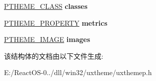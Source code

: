 \begin{DoxyCompactItemize}
\hyperlink{struct___t_h_e_m_e___c_l_a_s_s}{P\+T\+H\+E\+M\+E\+\_\+\+C\+L\+A\+SS} {\bfseries classes}
\item 
\mbox{\label{struct___t_h_e_m_e___f_i_l_e_a12c21a52f83266e7b3b21f800dd5a137}} 
\hyperlink{struct___t_h_e_m_e___p_r_o_p_e_r_t_y}{P\+T\+H\+E\+M\+E\+\_\+\+P\+R\+O\+P\+E\+R\+TY} {\bfseries metrics}
\item 
\mbox{\label{struct___t_h_e_m_e___f_i_l_e_ae49420650b359ceac4f36e0718f0aa44}} 
\hyperlink{struct___t_h_e_m_e___i_m_a_g_e}{P\+T\+H\+E\+M\+E\+\_\+\+I\+M\+A\+GE} {\bfseries images}
\end{DoxyCompactItemize}


该结构体的文档由以下文件生成\+:\begin{DoxyCompactItemize}
\item 
E\+:/\+React\+O\+S-\/0../dll/win32/uxtheme/uxthemep.\+h\end{DoxyCompactItemize}
